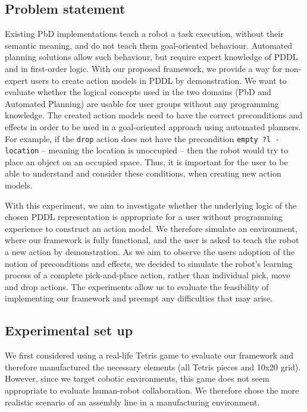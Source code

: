 
\subsection{Problem statement}
Existing PbD implementations teach a robot a task execution, without their semantic meaning, and do not teach them goal-oriented behaviour. Automated planning solutions allow such behaviour, but require expert knowledge of PDDL and in first-order logic. With our proposed framework, we provide a way for non-expert users to create action models in PDDL by demonstration. We want to evaluate whether the logical concepts used in the two domains (PbD and Automated Planning) are usable for user groups without any programming knowledge.
The created action models need to have the correct preconditions and effects in order to be used in a goal-oriented approach using automated planners. For example, if the \texttt{drop} action does not have the precondition \texttt{empty ?l - location} -- meaning the location is unoccupied -- then the robot would try to place an object on an occupied space. Thus, it is important for the user to be able to understand and consider these conditions, when creating new action models. 

With this experiment, we aim to investigate whether the underlying logic of the chosen PDDL representation is appropriate for a user without programming experience to construct an action model.
We therefore simulate an environment, where our framework is fully functional, and the user is asked to teach the robot a new action by demonstration. As we aim to observe the users adoption of the notion of preconditions and effects, we decided to simulate the robot's learning process of a complete pick-and-place action, rather than individual pick, move and drop actions. The experiments allow us to evaluate the feasibility of implementing our framework and preempt any difficulties that may arise.

\subsection{Experimental set up}
We first considered using a real-life Tetris game to evaluate our framework and therefore manufactured the necessary elements (all Tetris pieces and 10x20 grid). However, since we target cobotic environments, this game does not seem appropriate to evaluate human-robot collaboration. We therefore chose the more realistic scenario of an assembly line in a manufacturing environment.

